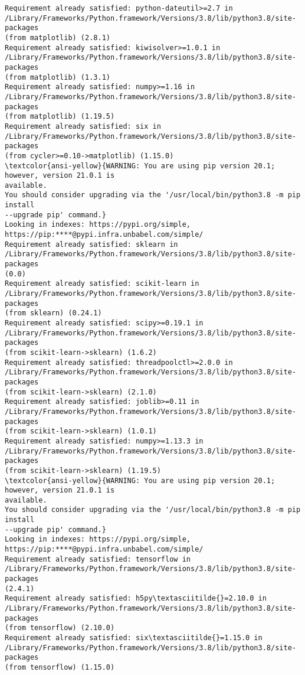 \documentclass[11pt]{article}
\begin{document}
\begin{Verbatim}[commandchars=\\\{\}]
Requirement already satisfied: python-dateutil>=2.7 in
/Library/Frameworks/Python.framework/Versions/3.8/lib/python3.8/site-packages
(from matplotlib) (2.8.1)
Requirement already satisfied: kiwisolver>=1.0.1 in
/Library/Frameworks/Python.framework/Versions/3.8/lib/python3.8/site-packages
(from matplotlib) (1.3.1)
Requirement already satisfied: numpy>=1.16 in
/Library/Frameworks/Python.framework/Versions/3.8/lib/python3.8/site-packages
(from matplotlib) (1.19.5)
Requirement already satisfied: six in
/Library/Frameworks/Python.framework/Versions/3.8/lib/python3.8/site-packages
(from cycler>=0.10->matplotlib) (1.15.0)
\textcolor{ansi-yellow}{WARNING: You are using pip version 20.1; however, version 21.0.1 is
available.
You should consider upgrading via the '/usr/local/bin/python3.8 -m pip install
--upgrade pip' command.}
Looking in indexes: https://pypi.org/simple,
https://pip:****@pypi.infra.unbabel.com/simple/
Requirement already satisfied: sklearn in
/Library/Frameworks/Python.framework/Versions/3.8/lib/python3.8/site-packages
(0.0)
Requirement already satisfied: scikit-learn in
/Library/Frameworks/Python.framework/Versions/3.8/lib/python3.8/site-packages
(from sklearn) (0.24.1)
Requirement already satisfied: scipy>=0.19.1 in
/Library/Frameworks/Python.framework/Versions/3.8/lib/python3.8/site-packages
(from scikit-learn->sklearn) (1.6.2)
Requirement already satisfied: threadpoolctl>=2.0.0 in
/Library/Frameworks/Python.framework/Versions/3.8/lib/python3.8/site-packages
(from scikit-learn->sklearn) (2.1.0)
Requirement already satisfied: joblib>=0.11 in
/Library/Frameworks/Python.framework/Versions/3.8/lib/python3.8/site-packages
(from scikit-learn->sklearn) (1.0.1)
Requirement already satisfied: numpy>=1.13.3 in
/Library/Frameworks/Python.framework/Versions/3.8/lib/python3.8/site-packages
(from scikit-learn->sklearn) (1.19.5)
\textcolor{ansi-yellow}{WARNING: You are using pip version 20.1; however, version 21.0.1 is
available.
You should consider upgrading via the '/usr/local/bin/python3.8 -m pip install
--upgrade pip' command.}
Looking in indexes: https://pypi.org/simple,
https://pip:****@pypi.infra.unbabel.com/simple/
Requirement already satisfied: tensorflow in
/Library/Frameworks/Python.framework/Versions/3.8/lib/python3.8/site-packages
(2.4.1)
Requirement already satisfied: h5py\textasciitilde{}=2.10.0 in
/Library/Frameworks/Python.framework/Versions/3.8/lib/python3.8/site-packages
(from tensorflow) (2.10.0)
Requirement already satisfied: six\textasciitilde{}=1.15.0 in
/Library/Frameworks/Python.framework/Versions/3.8/lib/python3.8/site-packages
(from tensorflow) (1.15.0)

\end{Verbatim}
\end{document}
